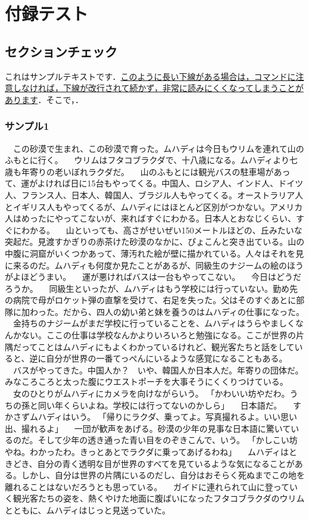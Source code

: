 \documentclass[11pt,a4paper,openright]{ltjsbook}
\begin{document}
\appendix

\chapter{付録テスト}

\section{セクションチェック}

これはサンプルテキストです．\uline{このように長い下線がある場合は，コマンドに注意しなければ，下線が改行されて続かず，非常に読みにくくなってしまうことがあります}．そこで，．

\subsection{サンプル1}

　この砂漠で生まれ、この砂漠で育った。ムハディは今日もウリムを連れて山のふもとに行く。
　ウリムはフタコブラクダで、十八歳になる。ムハディより七歳も年寄りの老いぼれラクダだ。
　山のふもとには観光バスの駐車場があって、運がよければ日に15台もやってくる。中国人、ロシア人、インド人、ドイツ人、フランス人、日本人、韓国人、ブラジル人もやってくる。オーストラリア人とイギリス人もやってくるが、ムハディにはほとんど区別がつかない。アメリカ人はめったにやってこないが、来ればすぐにわかる。日本人とおなじくらい、すぐにわかる。
　山といっても、高さがせいぜい150メートルほどの、丘みたいな突起だ。見渡すかぎりの赤茶けた砂漠のなかに、ぴょこんと突き出ている。山の中腹に洞窟がいくつかあって、薄汚れた絵が壁に描かれている。人々はそれを見に来るのだ。ムハディも何度か見たことがあるが、同級生のナジームの絵のほうがよほどうまい。
　運が悪ければバスは一台もやってこない。
　今日はどうだろうか。
　同級生といったが、ムハディはもう学校には行っていない。勤め先の病院で母がロケット弾の直撃を受けて、右足を失った。父はそのすぐあとに部隊に加わった。だから、四人の幼い弟と妹を養うのはムハディの仕事になった。
　金持ちのナジームがまだ学校に行っていることを、ムハディはうらやましくなんかない。ここの仕事は学校なんかよりいろいろと勉強になる。ここが世界の片隅だってことはムハディにもよくわかっているけれど、観光客たちと話をしていると、逆に自分が世界の一番てっぺんにいるような感覚になることもある。
　バスがやってきた。中国人か？　いや、韓国人か日本人だ。年寄りの団体だ。みなころころと太った腹にウエストポーチを大事そうにくくりつけている。
　女のひとりがムハディにカメラを向けながらいう。
「かわいい坊やだわ。うちの孫と同い年くらいよね。学校には行ってないのかしら」
　日本語だ。
　すかさずムハディはいう。
「帰りにラクダ、乗ってよ。写真撮れるよ。いい思い出、撮れるよ」
　一団が歓声をあげる。砂漠の少年の見事な日本語に驚いているのだ。そして少年の透き通った青い目をのぞきこんで、いう。
「かしこい坊やね。わかったわ。きっとあとでラクダに乗ってあげるわね」
　ムハディはときどき、自分の青く透明な目が世界のすべてを見ているような気になることがある。しかし、自分は世界の片隅にいるのだし、自分はおそらく死ぬまでこの地を離れることはないだろうとも思っている。
　ガイドに連れられて山に登っていく観光客たちの姿を、熱くやけた地面に腹ばいになったフタコブラクダのウリムとともに、ムハディはじっと見送っていた。
\end{document}

